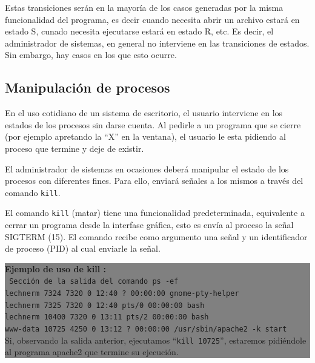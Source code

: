 \documentclass[12pt]{article}
\begin{document}
Estas transiciones serán en la mayoría de los casos generadas por la misma
funcionalidad del programa, es decir cuando necesita abrir un archivo
estará en estado S, cunado necesita ejecutarse estará en estado R, etc. 
Es decir, el administrador de sistemas, en general no interviene en las
transiciones de estados. Sin embargo, hay casos en los que esto ocurre. 

\subsection*{Manipulación de procesos}

En el uso cotidiano de un sistema de escritorio, el usuario interviene 
en los estados de los procesos sin darse cuenta. Al pedirle a un programa
que se cierre (por ejemplo apretando la ``X'' en la ventana), el usuario
le esta pidiendo al proceso que termine y deje de existir. 

El administrador de sistemas en ocasiones deberá manipular el estado de 
los procesos con diferentes fines. Para ello, enviará señales a los 
mismos a través del comando \texttt{kill}. 


El comando \texttt{kill} (matar) tiene una funcionalidad predeterminada, 
equivalente a cerrar un programa desde la interfase gráfica, esto es envía
al proceso la señal SIGTERM (15). El comando 
recibe como argumento una señal y un identificador de proceso (PID) al 
cual enviarle la señal. 

\colorbox{grey}{\parbox[t]{0.95\linewidth}{ \vspace*{0.5cm} { 
{\bf Ejemplo de uso de kill :} \\
{\tt
Sección de la salida del comando \texttt{ps -ef}\\
lechnerm  7324  7320  0 12:40 ?        00:00:00 gnome-pty-helper \\
lechnerm  7325  7320  0 12:40 pts/0    00:00:00 bash\\
lechnerm 10400  7320  0 13:11 pts/2    00:00:00 bash\\
www-data 10725  4250  0 13:12 ?        00:00:00 /usr/sbin/apache2 -k start \\
}
Si, observando la salida anterior, ejecutamos ``\texttt{kill 10725}'', 
estaremos pidiéndole al programa apache2 que termine su ejecución. 
} \vspace*{0.5cm} } } 
	
\end{document}
